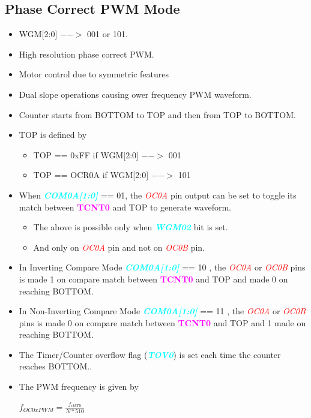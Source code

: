 \documentclass{article}
\newcommand{\bitFormat}[1]{\emph{\textbf{\textcolor{cyan}{#1}}}}
\newcommand{\regFormat}[1]{\textbf{\textcolor{magenta}{#1}}}
\newcommand{\pinFormat}[1]{\emph{\textcolor{red}{#1}}}
\begin{document}
\subsection{Phase Correct PWM Mode}
\begin{itemize}
    \item WGM[2:0] $-->$ 001 or 101.
    \item High resolution phase correct PWM.
    \item Motor control due to symmetric features
    \item Dual slope operations causing ower frequency PWM waveform.
    \item Counter starts from BOTTOM to TOP and then from TOP to BOTTOM.
    \item TOP is defined by
    \begin{itemize}
        \item TOP == 0xFF if WGM[2:0] $-->$ 001
        \item TOP == OCR0A if WGM[2:0] $-->$ 101
    \end{itemize}
    \item  When \bitFormat{COM0A[1:0]} == 01, the \pinFormat{OC0A} pin output can be set to toggle its match between \regFormat{TCNT0} and TOP to generate waveform.
    \begin{itemize}
        \item The above is possible only when \bitFormat{WGM02} bit is set.
        \item And only on \pinFormat{OC0A} pin and not on \pinFormat{OC0B} pin.
    \end{itemize}
    \item In Inverting Compare Mode \bitFormat{COM0A[1:0]} == 10 , the \pinFormat{OC0A} or \pinFormat{OC0B} pins is made 1 on compare match between \regFormat{TCNT0} and TOP and made 0 on reaching BOTTOM.
    \item In Non-Inverting Compare Mode \bitFormat{COM0A[1:0]} == 11 , the \pinFormat{OC0A} or \pinFormat{OC0B} pins is made 0 on compare match between \regFormat{TCNT0} and TOP and 1 made  on reaching BOTTOM.
    \item The Timer/Counter overflow flag (\bitFormat{TOV0}) is set each time the counter reaches BOTTOM..
    \item The PWM frequency is given by 
    \begin{center}
        { \Large $f_{OC0xPWM} = \frac{f_{clkT0}}{N * 510}$ }
    \end{center}
\end{itemize}
\end{document}
